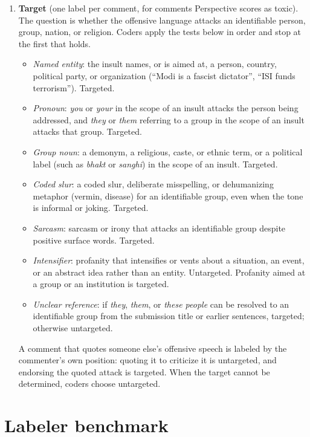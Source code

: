 \begin{enumerate}
\item \textbf{Target} (one label per comment, for comments Perspective scores as
toxic). The question is whether the offensive language attacks an identifiable
person, group, nation, or religion. Coders apply the tests below in order and stop
at the first that holds.
\begin{itemize}
\item \textit{Named entity}: the insult names, or is aimed at, a person, country,
political party, or organization (``Modi is a fascist dictator'', ``ISI funds
terrorism''). Targeted.
\item \textit{Pronoun}: \textit{you} or \textit{your} in the scope of an insult
attacks the person being addressed, and \textit{they} or \textit{them} referring
to a group in the scope of an insult attacks that group. Targeted.
\item \textit{Group noun}: a demonym, a religious, caste, or ethnic term, or a
political label (such as \textit{bhakt} or \textit{sanghi}) in the scope of an
insult. Targeted.
\item \textit{Coded slur}: a coded slur, deliberate misspelling, or dehumanizing
metaphor (vermin, disease) for an identifiable group, even when the tone is
informal or joking. Targeted.
\item \textit{Sarcasm}: sarcasm or irony that attacks an identifiable group despite
positive surface words. Targeted.
\item \textit{Intensifier}: profanity that intensifies or vents about a situation,
an event, or an abstract idea rather than an entity. Untargeted. Profanity aimed
at a group or an institution is targeted.
\item \textit{Unclear reference}: if \textit{they}, \textit{them}, or \textit{these
people} can be resolved to an identifiable group from the submission title or
earlier sentences, targeted; otherwise untargeted.
\end{itemize}
A comment that quotes someone else's offensive speech is labeled by the
commenter's own position: quoting it to criticize it is untargeted, and endorsing
the quoted attack is targeted. When the target cannot be determined, coders
choose untargeted.
\end{enumerate}

\section{Labeler benchmark}
\label{app:benchmark}


